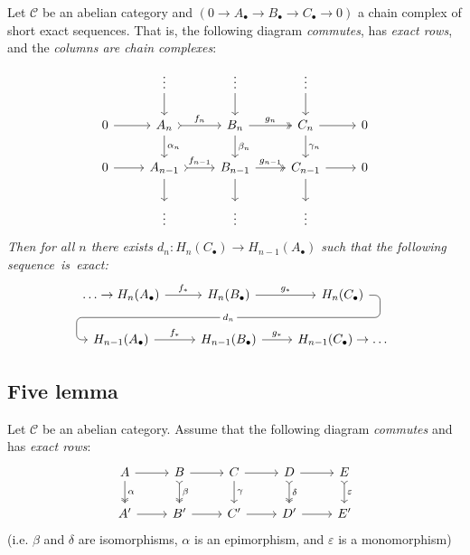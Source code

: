 \documentclass[10pt]{article}
\newcommand{\ccat}{\mathcal{C}}
\begin{document}
            Let $\ccat$ be an abelian category and $(0\to A_\bullet\to B_\bullet\to C_\bullet\to0)$ a chain complex of short exact sequences.
            That is, the following diagram \emph{commutes}, has \emph{exact rows}, and the \emph{columns are chain complexes}:
            \begin{equation*}
                \begin{tikzcd}
                    & \vdots \dar & \vdots \dar & \vdots \dar &\\
                    0 \rar & A_{n} \rar[tail]{f_{n}} \dar{\alpha_{n}} & B_{n} \rar[two heads]{g_{n}} \dar{\beta_{n}} & C_{n} \rar \dar{\gamma_{n}} & 0\\
                    0 \rar & A_{n-1} \rar[tail]{f_{n-1}} \dar & B_{n-1} \rar[two heads]{g_{n-1}} \dar & C_{n-1} \rar \dar & 0\\
                    & \vdots & \vdots & \vdots &
                \end{tikzcd}
            \end{equation*}
            \emph{Then for all $n$ there exists $d_n\colon H_n(C_\bullet)\to H_{n-1}(A_\bullet)$ such that the following \mbox{sequence is exact:}}
            \begin{equation*}
                \begin{tikzcd}
                    \ldots\to{H}_n(A_\bullet) \rar{f_*}
                    & {H}_n(B_\bullet) \rar{g_*} \ar[draw=none]{d}[name=X, anchor=center]{}
                    & {H}_n(C_\bullet) \ar[rounded corners,
                            to path={ -- ([xshift=2ex]\tikztostart.east)
                                      |- (X.center) \tikztonodes
                                      -| ([xshift=-2ex]\tikztotarget.west)
                                      -- (\tikztotarget)}]{dll}[description, at end]{d_n} \\
                    {H}_{n-1}(A_\bullet) \rar{f_*}
                    & {H}_{n-1}(B_\bullet) \rar{g_*}
                    & {H}_{n-1}(C_\bullet)\to\ldots
                \end{tikzcd}
            \end{equation*}

        \subsection{Five lemma}

            Let $\ccat$ be an abelian category.
            Assume that the following diagram \emph{commutes} and has \emph{exact rows}:
            \begin{equation*}
                \begin{tikzcd}
                    A \rar \dar[two heads]{\alpha} & B \rar \dar[two heads, tail]{\beta} & C \rar \dar{\gamma} & D \rar \dar[two heads, tail]{\delta} & E \dar[tail]{\varepsilon}\\
                    A' \rar & B' \rar & C' \rar & D' \rar & E'
                \end{tikzcd}
            \end{equation*}
            (i.e. $\beta$ and $\delta$ are isomorphisms, $\alpha$ is an epimorphism, and $\varepsilon$ is a monomorphism)
\end{document}
